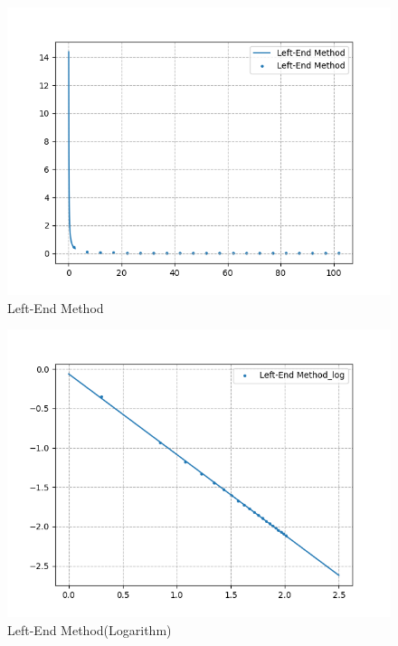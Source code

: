 \documentclass[12pt]{article}
\begin{document}
\begin{figure}[H]
    \centering
    \includegraphics[width=13cm]{left.png}
    \caption{Left-End Method}
\end{figure}


\begin{figure}[H]
    \centering
    \includegraphics[width=13cm]{leftlog.png}
    \caption{Left-End Method(Logarithm)}
\end{figure}
\end{document}
